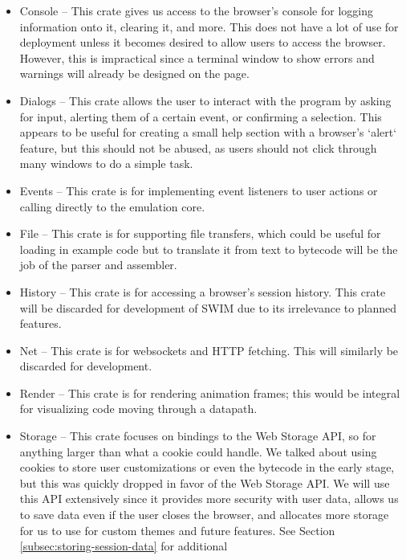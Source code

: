 \documentclass[
    paper=letter,
    parskip=half,
    fontsize=12pt,
    titlepage=firstiscover,
    toc=bibliography,
    numbers=endperiod
]{scrartcl}
\providecommand{\tightlist}{%
  \setlength{\itemsep}{0pt}\setlength{\parskip}{0pt}}
\begin{document}
\begin{itemize}
    \tightlist
    \item Console -- This crate gives us access to the browser's console for
          logging information onto it, clearing it, and more. This does not have a
          lot of use for deployment unless it becomes desired to allow users to
          access the browser. However, this is impractical since a terminal window
          to show errors and warnings will already be designed on the page.
    \item Dialogs -- This crate allows the user to interact with the program by
          asking for input, alerting them of a certain event, or confirming a
          selection. This appears to be useful for creating a small help section
          with a browser's `alert` feature, but this should not be abused, as
          users should not click through many windows to do a simple task.
    \item Events -- This crate is for implementing event listeners to user actions
          or calling directly to the emulation core.
    \item File -- This crate is for supporting file transfers, which could be
          useful for loading in example code but to translate it from text to
          bytecode will be the job of the parser and assembler.
    \item History -- This crate is for accessing a browser's session history. This
          crate will be discarded for development of SWIM due to its irrelevance
          to planned features.
    \item Net -- This crate is for websockets and HTTP fetching. This will
          similarly be discarded for development.
    \item Render -- This crate is for rendering animation frames; this would be
          integral for visualizing code moving through a datapath.
    \item Storage -- This crate focuses on bindings to the Web Storage API, so for
          anything larger than what a cookie could handle. We talked about using
          cookies to store user customizations or even the bytecode in the early
          stage, but this was quickly dropped in favor of the Web Storage API. We
          will use this API extensively since it provides more security with user
          data, allows us to save data even if the user closes the browser, and
          allocates more storage for us to use for custom themes and future
          features. See Section \ref{subsec:storing-session-data} for additional

\end{itemize}
\end{document}
